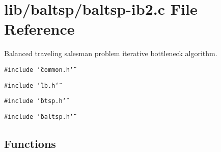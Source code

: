 \hypertarget{lib_2baltsp_2baltsp-ib2_8c}{
\section{lib/baltsp/baltsp-ib2.c File Reference}
\label{lib_2baltsp_2baltsp-ib2_8c}
}
Balanced traveling salesman problem iterative bottleneck algorithm.  


{\tt \#include \char`\"{}common.h\char`\"{}}\par
{\tt \#include \char`\"{}lb.h\char`\"{}}\par
{\tt \#include \char`\"{}btsp.h\char`\"{}}\par
{\tt \#include \char`\"{}baltsp.h\char`\"{}}\par
\subsection*{Functions}

